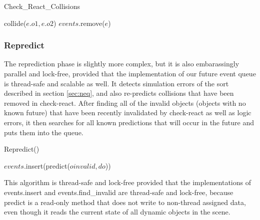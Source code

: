 \documentclass[conference]{IEEEtran}
\begin{document}
\begin{algorithm}
\caption{Check\_React\_Collisions}
\begin{algorithmic}
\STATE {}
	\STATE {}
		\STATE {}
			\STATE {}
			\STATE collide($e.o1,e.o2$)
		\ENDIF
		\STATE {}
		\STATE $events$.remove($e$)
	\ENDIF
\ENDFOR
\end{algorithmic}
\end{algorithm}


\subsubsection{Repredict}
The reprediction phase is slightly more complex, but it is also embarassingly parallel and lock-free, provided that the implementation of our future event queue is thread-safe and scalable as well.  It detects simulation errors of the sort described in section \ref{sec:neq}, and also re-predicts collisions
that have been removed in check-react.  After finding all of the invalid objects (objects with no known future) that have been recently invalidated by check-react as well as logic errors, it then
searches for all known predictions that will occur in the future and puts them into the queue.  
\begin{algorithm}
\caption{Repredict()}
\begin{algorithmic}
\STATE {}
	\STATE {}
			\STATE $events$.insert(predict($oinvalid,do$))
		\ENDFOR
	\ENDIF
\ENDFOR
\end{algorithmic}
\end{algorithm}
This algorithm is thread-safe and lock-free provided that the implementations of events.insert and events.find\_invalid are thread-safe and lock-free, because predict is a read-only method that 
does not write to non-thread assigned data, even though it reads the current state of all dynamic objects in the scene.
\end{document}
